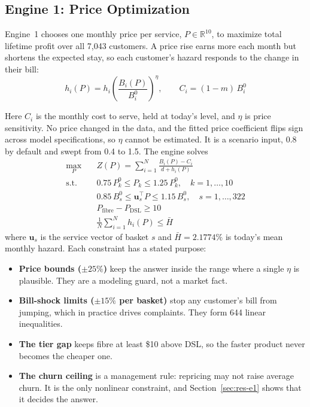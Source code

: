 \documentclass[conference]{IEEEtran}
\begin{document}
\subsection{Engine 1: Price Optimization}
\label{sec:engine1}

Engine~1 chooses one monthly price per service, $P \in \mathbb{R}^{10}$, to maximize total lifetime profit over all 7,043 customers. A price rise earns more each month but shortens the expected stay, so each customer's hazard responds to the change in their bill:
\begin{equation}
h_i(P) = h_i \left( \frac{B_i(P)}{B_i^{0}} \right)^{\eta}, \qquad C_i = (1-m)\,B_i^{0}
\label{eq:response}
\end{equation}

Here $C_i$ is the monthly cost to serve, held at today's level, and $\eta$ is price sensitivity. No price changed in the data, and the fitted price coefficient flips sign across model specifications, so $\eta$ cannot be estimated. It is a scenario input, 0.8 by default and swept from 0.4 to 1.5. The engine solves
\begin{equation}
\begin{aligned}
\max_{P}\quad & Z(P) = \sum_{i=1}^{N} \frac{B_i(P) - C_i}{d + h_i(P)} \\
\text{s.t.}\quad & 0.75\,P_k^{0} \le P_k \le 1.25\,P_k^{0}, \quad k = 1,\dots,10 \\
& 0.85\,B_s^{0} \le \mathbf{u}_s^{\top} P \le 1.15\,B_s^{0}, \quad s = 1,\dots,322 \\
& P_{\mathrm{fibre}} - P_{\mathrm{DSL}} \ge 10 \\
& \tfrac{1}{N}\textstyle\sum_{i=1}^{N} h_i(P) \le \bar{H}
\end{aligned}
\label{eq:nlp}
\end{equation}
where $\mathbf{u}_s$ is the service vector of basket $s$ and $\bar{H} = 2.1774\%$ is today's mean monthly hazard. Each constraint has a stated purpose:
\begin{itemize}
\item \textbf{Price bounds ($\pm 25\%$)} keep the answer inside the range where a single $\eta$ is plausible. They are a modeling guard, not a market fact.
\item \textbf{Bill-shock limits ($\pm 15\%$ per basket)} stop any customer's bill from jumping, which in practice drives complaints. They form 644 linear inequalities.
\item \textbf{The tier gap} keeps fibre at least \$10 above DSL, so the faster product never becomes the cheaper one.
\item \textbf{The churn ceiling} is a management rule: repricing may not raise average churn. It is the only nonlinear constraint, and Section~\ref{sec:res-e1} shows that it decides the answer.
\end{itemize}
\end{document}
